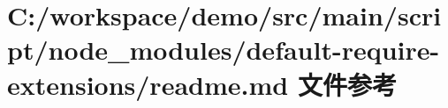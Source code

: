 \hypertarget{node__modules_2default-require-extensions_2_r_e_a_d_m_e_8md}{}\section{C\+:/workspace/demo/src/main/script/node\+\_\+modules/default-\/require-\/extensions/readme.md 文件参考}
\label{node__modules_2default-require-extensions_2_r_e_a_d_m_e_8md}
